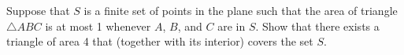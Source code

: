 Suppose that $S$ is a finite set of points in the plane such that the area of triangle
$\triangle ABC$ is at most 1 whenever $A$, $B$, and $C$ are in $S$. Show that there exists a triangle of area 4 that (together with its interior) covers the set $S$.
